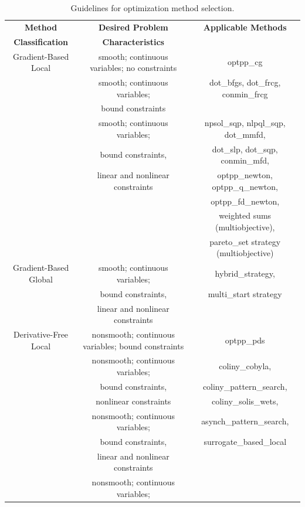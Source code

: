 \begin{table}[hbp]
\centering
\caption{Guidelines for optimization method selection.} 
\label{opt:usage:guideopt}\vspace{2mm}
\begin{tabular}{|c|c|c|}
\hline
\textbf{Method} & \textbf{Desired Problem} & \textbf{Applicable Methods} \\
\textbf{Classification} & \textbf{Characteristics} & \\
\hline
Gradient-Based Local & smooth; continuous variables; no constraints
& optpp\_cg \\
\hline
         & smooth; continuous variables; & dot\_bfgs, dot\_frcg, conmin\_frcg \\
         & bound constraints &  \\
\hline
         & smooth; continuous variables; & npsol\_sqp, nlpql\_sqp, dot\_mmfd, \\
         & bound constraints, & dot\_slp, dot\_sqp,
         conmin\_mfd, \\
         & linear and nonlinear constraints & optpp\_newton,
         optpp\_q\_newton, \\
         &          &optpp\_fd\_newton, \\
         &          & weighted sums (multiobjective), \\
         &          & pareto\_set strategy (multiobjective) \\
\hline
Gradient-Based Global & smooth; continuous variables; & hybrid\_strategy, \\
         &  bound constraints, & multi\_start strategy \\
         &  linear and nonlinear constraints & \\
\hline
Derivative-Free Local & nonsmooth; continuous variables; bound constraints
& optpp\_pds \\
\hline
         & nonsmooth; continuous variables; & coliny\_cobyla,  \\
         & bound constraints, & coliny\_pattern\_search, \\
         & nonlinear constraints & coliny\_solis\_wets, \\
\hline
         & nonsmooth; continuous variables; & asynch\_pattern\_search, \\
         & bound constraints, & surrogate\_based\_local \\
         & linear and nonlinear constraints & \\
\hline
         & nonsmooth; continuous variables; &  \\

\end{tabular}
\end{table}
